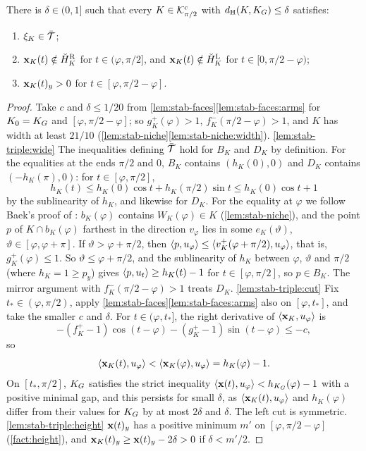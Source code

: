 \begin{lemma}\label{lem:stab-triple}
There is $\delta\in(0,1]$ such that every $K\in\mathcal{K}^{\mathrm{c}}_{\pi/2}$ with
$d_{\mathrm{H}}(K,K_G)\le\delta$ satisfies:
\begin{enumerate}[label=(\alph*)]
\item\label{lem:stab-triple:wide} $\xi_K\in\bar{\mathcal{T}}$;
\item\label{lem:stab-triple:cut} $\mathbf{x}_K(t)\notin\breve H^{\mathrm R}_K$ for
$t\in(\varphi,\pi/2]$, and $\mathbf{x}_K(t)\notin\breve H^{\mathrm L}_K$ for
$t\in[0,\pi/2-\varphi)$;
\item\label{lem:stab-triple:height} $\mathbf{x}_K(t)_y>0$ for
$t\in[\varphi,\pi/2-\varphi]$.
\end{enumerate}
\end{lemma}

\begin{proof}
Take $c$ and $\delta\le1/20$ from
\cref{lem:stab-faces}\ref{lem:stab-faces:arms} for $K_0=K_G$ and
\mbox{$[\varphi,\pi/2-\varphi]$}; so $g^+_K(\varphi)>1$,
$f^-_K(\pi/2-\varphi)>1$, and $K$ has width at least $21/10$
(\cref{lem:stab-niche}\ref{lem:stab-niche:width}).
\ref{lem:stab-triple:wide} The inequalities defining $\bar{\mathcal{T}}$ hold for $B_K$
and $D_K$ by definition. For the equalities at the ends $\pi/2$ and $0$, $B_K$
contains $(h_K(0),0)$ and $D_K$ contains $(-h_K(\pi),0)$: for
$t\in[\varphi,\pi/2]$,
\[
  h_K(t)\le h_K(0)\cos t+h_K(\pi/2)\sin t\le h_K(0)\cos t+1
\]
by the sublinearity of $h_K$, and likewise for $D_K$. For the
equality at $\varphi$ we follow Baek's proof of :
$b_K(\varphi)$ contains $W_K(\varphi)\in K$ (\cref{lem:stab-niche}), and the
point $p$ of $K\cap b_K(\varphi)$ farthest in the direction $v_\varphi$ lies in
some $e_K(\vartheta)$, $\vartheta\in[\varphi,\varphi+\pi]$. If
$\vartheta>\varphi+\pi/2$, then
$\langle p,u_\varphi\rangle\le\langle v^+_K(\varphi+\pi/2),u_\varphi\rangle$, that is,
$g^+_K(\varphi)\le1$. So $\vartheta\le\varphi+\pi/2$, and the sublinearity of
$h_K$ between $\varphi$, $\vartheta$ and $\pi/2$ (where $h_K=1\ge p_y$) gives
$\langle p,u_t\rangle\ge h_K(t)-1$ for $t\in[\varphi,\pi/2]$, so $p\in B_K$. The mirror
argument with $f^-_K(\pi/2-\varphi)>1$ treats $D_K$.
\ref{lem:stab-triple:cut} Fix $t_*\in(\varphi,\pi/2)$, apply
\cref{lem:stab-faces}\ref{lem:stab-faces:arms} also on $[\varphi,t_*]$, and
take the smaller $c$ and $\delta$. For $t\in(\varphi,t_*]$, the right derivative
of $\langle \mathbf{x}_K,u_\varphi\rangle$ is
\[
  -(f^+_K-1)\cos(t-\varphi)-(g^+_K-1)\sin(t-\varphi)\le-c,
\]
so
\[
  \langle \mathbf{x}_K(t),u_\varphi\rangle<\langle \mathbf{x}_K(\varphi),u_\varphi\rangle=h_K(\varphi)-1.
\]
On $[t_*,\pi/2]$, $K_G$ satisfies the strict inequality
$\langle \mathbf{x}(t),u_\varphi\rangle<h_{K_G}(\varphi)-1$  with a positive
minimal gap, and this persists for small $\delta$, as
$\langle \mathbf{x}_K(t),u_\varphi\rangle$ and $h_K(\varphi)$ differ from their values for
$K_G$ by at most $2\delta$ and $\delta$. The left cut is symmetric.
\ref{lem:stab-triple:height} $\mathbf{x}(t)_y$ has a positive minimum $m'$ on
$[\varphi,\pi/2-\varphi]$ (\cref{fact:height}), and
$\mathbf{x}_K(t)_y\ge\mathbf{x}(t)_y-2\delta>0$ if $\delta<m'/2$.
\end{proof}

